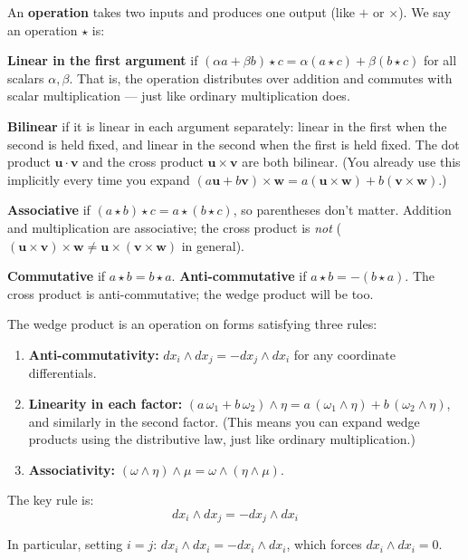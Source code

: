 \documentclass[11pt]{report}
\begin{document}
\begin{note}
An \textbf{operation} takes two inputs and produces one output (like $+$ or $\times$). We say an operation $\star$ is:

\textbf{Linear in the first argument} if $(\alpha a + \beta b) \star c = \alpha (a \star c) + \beta (b \star c)$ for all scalars $\alpha, \beta$. That is, the operation distributes over addition and commutes with scalar multiplication --- just like ordinary multiplication does.

\textbf{Bilinear} if it is linear in each argument separately: linear in the first when the second is held fixed, and linear in the second when the first is held fixed. The dot product $\mathbf{u} \cdot \mathbf{v}$ and the cross product $\mathbf{u} \times \mathbf{v}$ are both bilinear. (You already use this implicitly every time you expand $(a\mathbf{u} + b\mathbf{v}) \times \mathbf{w} = a(\mathbf{u} \times \mathbf{w}) + b(\mathbf{v} \times \mathbf{w})$.)

\textbf{Associative} if $(a \star b) \star c = a \star (b \star c)$, so parentheses don't matter. Addition and multiplication are associative; the cross product is \textit{not} ($(\mathbf{u} \times \mathbf{v}) \times \mathbf{w} \neq \mathbf{u} \times (\mathbf{v} \times \mathbf{w})$ in general).

\textbf{Commutative} if $a \star b = b \star a$. \textbf{Anti-commutative} if $a \star b = -(b \star a)$. The cross product is anti-commutative; the wedge product will be too.
\end{note}

\begin{definition}
The wedge product is an operation on forms satisfying three rules:

\begin{enumerate}
    \item \textbf{Anti-commutativity:} $dx_i \wedge dx_j = -dx_j \wedge dx_i$ for any coordinate differentials.
    \item \textbf{Linearity in each factor:} $(a\,\omega_1 + b\,\omega_2) \wedge \eta = a\,(\omega_1 \wedge \eta) + b\,(\omega_2 \wedge \eta)$, and similarly in the second factor. (This means you can expand wedge products using the distributive law, just like ordinary multiplication.)
    \item \textbf{Associativity:} $(\omega \wedge \eta) \wedge \mu = \omega \wedge (\eta \wedge \mu)$.
\end{enumerate}

The key rule is:
\[
\boxed{dx_i \wedge dx_j = -dx_j \wedge dx_i}
\]

In particular, setting $i = j$: $dx_i \wedge dx_i = -dx_i \wedge dx_i$, which forces $dx_i \wedge dx_i = 0$.
\end{definition}
\end{document}
